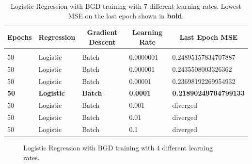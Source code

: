\documentclass{article} %
\begin{document}
\begin{table}[!htbp]
\caption{Logistic Regression with BGD training with 7 different learning rates. Lowest MSE on the last epoch shown in \textbf{bold}.}
\label{Table7}
\begin{center}
\begin{tabular}{l l l l l}
\multicolumn{1}{c}{\bf Epochs} &\multicolumn{1}{c}{\bf Regression}  &\multicolumn{1}{c}{\bf Gradient Descent} &\multicolumn{1}{c}{\bf Learning Rate} &\multicolumn{1}{c}{\bf Last Epoch MSE}
\\ \hline \\

50 & Logistic & Batch & 0.0000001 & 0.24895157834707887\\
50 & Logistic & Batch & 0.000001  & 0.2435508003326362\\
50 & Logistic & Batch & 0.00001   & 0.23698192269954932\\

\textbf{50} & \textbf{Logistic} & \textbf{Batch} & \textbf{0.0001} & \textbf{0.21890249704799133}\\

50 & Logistic & Batch & 0.001     & diverged\\
50 & Logistic & Batch & 0.01      & diverged\\
50 & Logistic & Batch & 0.1       & diverged\\

\end{tabular}
\end{center}
\end{table}

\begin{figure}[ht]
\begin{center}
\end{center}
\caption{Logistic Regression with BGD training with 4 different learning rates.}
\label{Fig10}
\end{figure}
\end{document}
